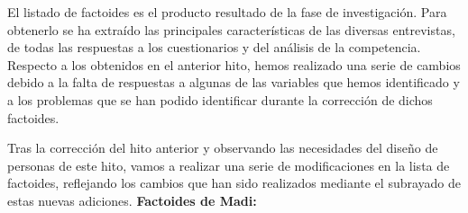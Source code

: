 El listado de factoides es el producto resultado de la fase de investigación. Para obtenerlo se ha extraído las principales características de las
diversas entrevistas, de todas las respuestas a los cuestionarios y del análisis de la competencia. Respecto a los obtenidos en el anterior hito,
hemos realizado una serie de cambios debido a la falta de respuestas a algunas de las variables que hemos identificado y a los problemas que se
han podido identificar durante la corrección de dichos factoides.


Tras la corrección del hito anterior y observando las necesidades del diseño de personas de este hito, vamos a realizar una serie de modificaciones
en la lista de factoides, reflejando los cambios que han sido realizados mediante el subrayado de estas nuevas adiciones.
\textbf{Factoides de Madi:}

